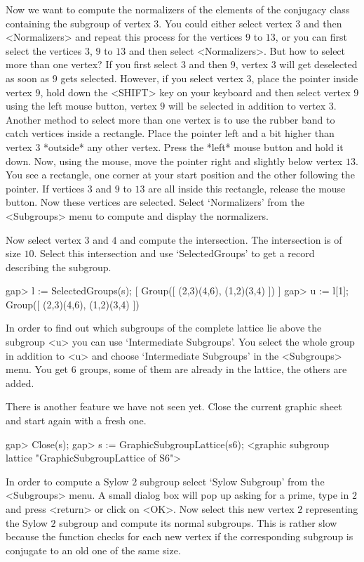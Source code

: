 Now we want to compute the normalizers of the elements of the conjugacy
class containing the subgroup of vertex $3$.  You could either select
vertex $3$ and then <Normalizers> and repeat this process for the vertices
$9$ to $13$, or you can first select the vertices $3$, $9$ to $13$ and then
select <Normalizers>.  But how to select more than one vertex?  If you
first select $3$ and then $9$, vertex $3$ will get deselected as soon as
$9$ gets selected.  However, if you select vertex $3$, place the pointer
inside vertex $9$, hold down the <SHIFT> key on your keyboard and then
select vertex $9$ using the left mouse button, vertex $9$ will be selected
in addition to vertex $3$.  Another method to select more than one vertex
is to use the rubber band to catch vertices inside a rectangle.  Place the
pointer left and a bit higher than vertex $3$ *outside* any other vertex.
Press the *left* mouse button and hold it down.  Now, using the mouse, move
the pointer right and slightly below vertex $13$.  You see a rectangle, one
corner at your start position and the other following the pointer.  If
vertices $3$ and $9$ to $13$ are all inside this rectangle, release the
mouse button.  Now these vertices are selected.  Select `Normalizers' from
the <Subgroups> menu to compute and display the normalizers.

Now select vertex $3$ and $4$ and compute the intersection.  The
intersection is of size $10$.  Select this intersection and use
`SelectedGroups' to get a {\GAP} record describing the subgroup.

\begintt
gap> l := SelectedGroups(s);
[ Group([ (2,3)(4,6), (1,2)(3,4) ]) ]
gap> u := l[1];
Group([ (2,3)(4,6), (1,2)(3,4) ])
\endtt

In order  to find out which subgroups  of the complete lattice  lie above
the subgroup <u> you can  use `Intermediate Subgroups'. You select the
whole group in addition to <u> and choose `Intermediate Subgroups' in the 
<Subgroups> menu. You get 6 groups, some of them are already in the
lattice, the others are added.

There is another feature we have not seen yet.  Close the current graphic
sheet and start again with a fresh one.

\begintt
gap> Close(s);
gap> s := GraphicSubgroupLattice(s6);
<graphic subgroup lattice "GraphicSubgroupLattice of S6">
\endtt

In order to compute a Sylow $2$ subgroup select `Sylow Subgroup' from the
<Subgroups> menu.   A small dialog box  will  pop up asking  for a prime,
type in  $2$ and press <return> or  click on <OK>.   Now select  this new
vertex $2$   representing the Sylow $2$  subgroup  and compute its normal
subgroups.  This is rather slow because the  function checks for each new
vertex if the corresponding  subgroup is conjugate to  an old one  of the
same size.  


